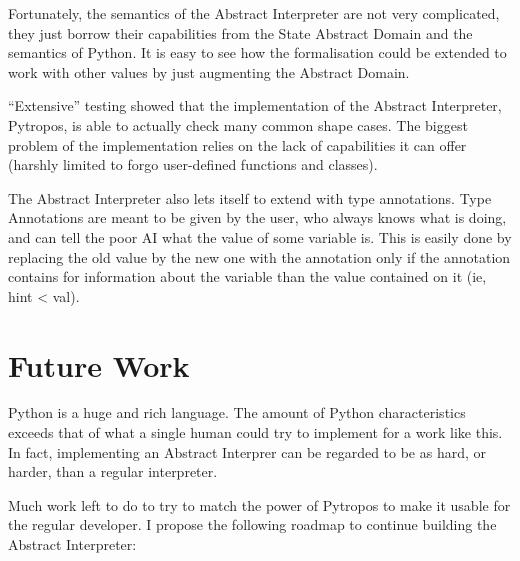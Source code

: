 Fortunately, the semantics of the Abstract Interpreter are not very
complicated, they just borrow their capabilities from the State Abstract
Domain and the semantics of Python. It is easy to see how the
formalisation could be extended to work with other values by just
augmenting the Abstract Domain.

\enquote{Extensive} testing showed that the implementation of the
Abstract Interpreter, Pytropos, is able to actually check many common
shape cases. The biggest problem of the implementation relies on the
lack of capabilities it can offer (harshly limited to forgo user-defined
functions and classes).

The Abstract Interpreter also lets itself to extend with type
annotations. Type Annotations are meant to be given by the user, who
always knows what is doing, and can tell the poor AI what the value of
some variable is. This is easily done by replacing the old value by the
new one with the annotation only if the annotation contains for
information about the variable than the value contained on it (ie, hint
\textless{} val).

\section{Future Work}\label{future-work}

Python is a huge and rich language. The amount of Python characteristics
exceeds that of what a single human could try to implement for a work
like this. In fact, implementing an Abstract Interprer can be regarded
to be as hard, or harder, than a regular interpreter.

Much work left to do to try to match the power of Pytropos to make it
usable for the regular developer. I propose the following roadmap to
continue building the Abstract Interpreter:

